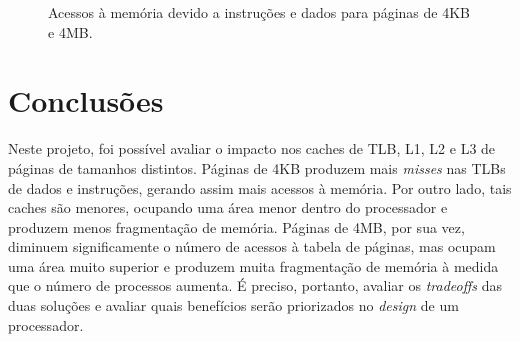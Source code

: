 \documentclass[12pt]{article}
\begin{document}
\begin{figure}[h]
  \centering
  \hfill
  \caption{Acessos à memória devido a instruções e dados para páginas de 4KB e
  4MB.}
\end{figure}

\section {Conclusões}

Neste projeto, foi possível avaliar o impacto nos caches de TLB, L1, L2 e L3 de
páginas de tamanhos distintos. Páginas de 4KB produzem mais \textit{misses} nas
TLBs de dados e instruções, gerando assim mais acessos à memória. Por outro
lado, tais caches são menores, ocupando uma área menor dentro do
processador e produzem menos fragmentação de memória. Páginas de 4MB, por sua
vez, diminuem significamente o número de acessos à tabela de páginas, mas ocupam uma área muito superior e produzem
muita fragmentação de memória à medida que o número de processos aumenta. É
preciso, portanto, avaliar os \textit{tradeoffs} das duas soluções e avaliar
quais benefícios serão priorizados no \textit{design} de um processador.



\end{document}
